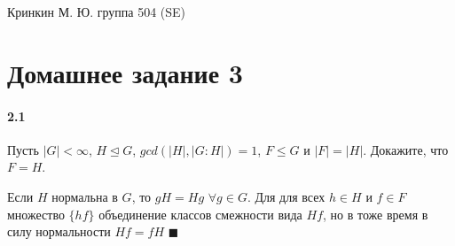 \documentclass[a4paper,12pt]{article}
\begin{document}
\sloppy

\lstset{
	basicstyle=\small,
	stringstyle=\ttfamily,
	showstringspaces=false,
	columns=fixed,
	breaklines=true,
	numbers=right,
	numberstyle=\tiny
}

\newtheorem{Def}{Определение}[section]
\newtheorem{Th}{Теорема}
\newtheorem{Lem}[Th]{Лемма}
\newenvironment{Proof}
	{\par\noindent{\bf Доказательство.}}
	{\hfill$\scriptstyle\blacksquare$}
\newenvironment{Solution}
	{\par\noindent{\bf Решение.}}
	{\hfill$\scriptstyle\blacksquare$}


\begin{flushright}
	Кринкин М. Ю. группа 504 (SE)
\end{flushright}

\section{Домашнее задание 3}

\paragraph{2.1} Пусть $\left|G\right| < \infty$, $H \trianglelefteq G$, $gcd\left(\left|H\right|,\left|G:H\right|\right) = 1$, $F \le G$ и $\left|F\right| = \left|H\right|$. Докажите, что $F = H$.

\begin{Solution}
Если $H$ нормальна в $G$, то $gH = Hg$ $\forall g \in G$. Для для всех $h \in H$ и $f \in F$ множество $\{hf\}$ объединение классов смежности вида $Hf$, но в тоже время в силу нормальности $Hf = fH$
\end{Solution}
\end{document}
